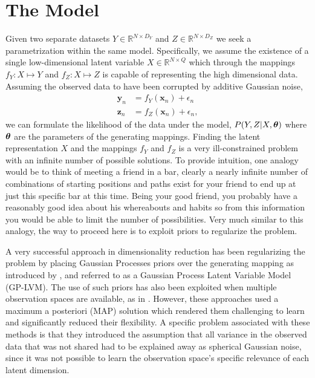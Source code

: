 \section{The Model \label{model}}
Given two separate datasets $Y \in \mathbb{R}^{N\times D_Y}$ and
$Z\in\mathbb{R}^{N\times D_Z}$ we seek a parametrization within the
same model. Specifically, we assume the existence of a single
low-dimensional latent variable $X\in \mathbb{R}^{N\times Q}$ which
through the mappings $f_Y: X \mapsto Y$ and $f_Z: X \mapsto Z$ is
capable of representing the high dimensional data. 
Assuming the observed
data to have been corrupted by additive Gaussian noise,
\begin{align}
  \mathbf{y}_n &= f_Y(\mathbf{x}_n) + \epsilon_n\nonumber\\
  \mathbf{z}_n &= f_Z(\mathbf{x}_n) + \epsilon_n,
\end{align}
we can formulate the likelihood of the data under the model,
$P(Y,Z|X,\boldsymbol \theta)$ where $\boldsymbol \theta$ are the parameters of the generating
mappings. Finding the latent representation $X$ and the mappings $f_Y$
and $f_Z$ is a very ill-constrained problem with an infinite number of
possible solutions. To provide intuition, one analogy would be to think
of meeting a friend in a bar, clearly a nearly infinite number of combinations
of starting positions and paths exist for your friend to end up at
just this specific bar at this time. Being your good friend, you
probably have a reasonably good idea about his whereabouts and habits
so from this information you would be able to limit the number of
possibilities. Very much similar to this analogy, the way to proceed
here is to exploit priors to regularize the problem.

A very successful approach in dimensionality reduction has been regularizing the
 problem by placing Gaussian Processes
\cite{Rasmussen:book06} priors over the generating mapping as
introduced by \cite{Lawrence:2005vk}, and referred to as a Gaussian Process
Latent Variable Model (GP-LVM). The use of such priors has also been
exploited when multiple observation spaces are available, as in
\cite{Shon:2006wr,Ek:2007uo}. However, these approaches used a maximum a posteriori (MAP)
solution which rendered them challenging to learn and significantly
reduced their flexibility. A specific problem associated with these methods is that
they introduced the assumption that all variance in the observed data that
was not shared had to be explained away as spherical Gaussian noise, since it was not
possible to learn the observation space's specific relevance of each
latent dimension.

